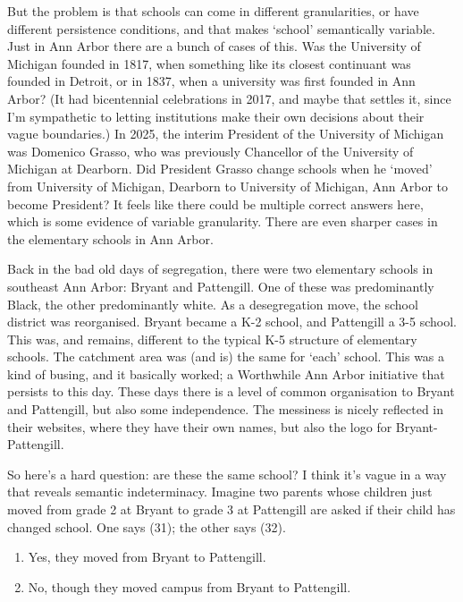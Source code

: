 \documentclass[
  11pt,
  letterpaper,
  DIV=11,
  numbers=noendperiod,
  twoside]{scrartcl}
\providecommand{\tightlist}{%
  \setlength{\itemsep}{0pt}\setlength{\parskip}{0pt}}
\begin{document}
But the problem is that schools can come in different granularities, or
have different persistence conditions, and that makes `school'
semantically variable. Just in Ann Arbor there are a bunch of cases of
this. Was the University of Michigan founded in 1817, when something
like its closest continuant was founded in Detroit, or in 1837, when a
university was first founded in Ann Arbor? (It had bicentennial
celebrations in 2017, and maybe that settles it, since I'm sympathetic
to letting institutions make their own decisions about their vague
boundaries.) In 2025, the interim President of the University of
Michigan was Domenico Grasso, who was previously Chancellor of the
University of Michigan at Dearborn. Did President Grasso change schools
when he `moved' from University of Michigan, Dearborn to University of
Michigan, Ann Arbor to become President? It feels like there could be
multiple correct answers here, which is some evidence of variable
granularity. There are even sharper cases in the elementary schools in
Ann Arbor.

Back in the bad old days of segregation, there were two elementary
schools in southeast Ann Arbor: Bryant and Pattengill. One of these was
predominantly Black, the other predominantly white. As a desegregation
move, the school district was reorganised. Bryant became a K-2 school,
and Pattengill a 3-5 school. This was, and remains, different to the
typical K-5 structure of elementary schools. The catchment area was (and
is) the same for `each' school. This was a kind of busing, and it
basically worked; a Worthwhile Ann Arbor initiative that persists to
this day. These days there is a level of common organisation to Bryant
and Pattengill, but also some independence. The messiness is nicely
reflected in their websites, where they have their own names, but also
the logo for Bryant-Pattengill.

So here's a hard question: are these the same school? I think it's vague
in a way that reveals semantic indeterminacy. Imagine two parents whose
children just moved from grade 2 at Bryant to grade 3 at Pattengill are
asked if their child has changed school. One says (31); the other says
(32).

\begin{enumerate}
\def\labelenumi{(\arabic{enumi})}
\setcounter{enumi}{30}
\tightlist
\item
  Yes, they moved from Bryant to Pattengill.
\item
  No, though they moved campus from Bryant to Pattengill.
\end{enumerate}
\end{document}
